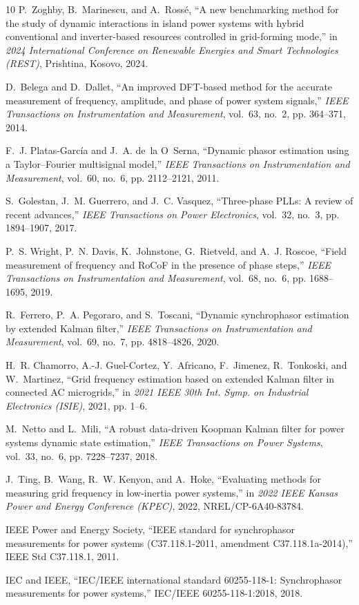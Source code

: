 \documentclass[conference,letterpaper]{IEEEtran}
\begin{document}
\begin{thebibliography}{10}
P.~Zoghby, B.~Marinescu, and A.~Ross{\'e}, ``A new benchmarking method for the
  study of dynamic interactions in island power systems with hybrid
  conventional and inverter-based resources controlled in grid-forming mode,''
  in \emph{2024 International Conference on Renewable Energies and Smart
  Technologies (REST)}, Prishtina, Kosovo, 2024.

D.~Belega and D.~Dallet, ``An improved {DFT}-based method for the accurate
  measurement of frequency, amplitude, and phase of power system signals,''
  \emph{IEEE Transactions on Instrumentation and Measurement}, vol.~63, no.~2,
  pp. 364--371, 2014.

F.~J. Platas-Garc{\'i}a and J.~A. de~la O~Serna, ``Dynamic phasor estimation
  using a {Taylor--Fourier} multisignal model,'' \emph{IEEE Transactions on
  Instrumentation and Measurement}, vol.~60, no.~6, pp. 2112--2121, 2011.

S.~Golestan, J.~M. Guerrero, and J.~C. Vasquez, ``Three-phase {PLL}s: A review
  of recent advances,'' \emph{IEEE Transactions on Power Electronics}, vol.~32,
  no.~3, pp. 1894--1907, 2017.

P.~S. Wright, P.~N. Davis, K.~Johnstone, G.~Rietveld, and A.~J. Roscoe, ``Field
  measurement of frequency and {RoCoF} in the presence of phase steps,''
  \emph{IEEE Transactions on Instrumentation and Measurement}, vol.~68, no.~6,
  pp. 1688--1695, 2019.

R.~Ferrero, P.~A. Pegoraro, and S.~Toscani, ``Dynamic synchrophasor estimation
  by extended {Kalman} filter,'' \emph{IEEE Transactions on Instrumentation and
  Measurement}, vol.~69, no.~7, pp. 4818--4826, 2020.

H.~R. Chamorro, A.-J. Guel-Cortez, Y.~Africano, F.~Jimenez, R.~Tonkoski, and
  W.~Martinez, ``Grid frequency estimation based on extended {Kalman} filter in
  connected {AC} microgrids,'' in \emph{2021 IEEE 30th Int. Symp. on Industrial
  Electronics (ISIE)}, 2021, pp. 1--6.

M.~Netto and L.~Mili, ``A robust data-driven {Koopman Kalman} filter for power
  systems dynamic state estimation,'' \emph{IEEE Transactions on Power
  Systems}, vol.~33, no.~6, pp. 7228--7237, 2018.

J.~Ting, B.~Wang, R.~W. Kenyon, and A.~Hoke, ``Evaluating methods for measuring
  grid frequency in low-inertia power systems,'' in \emph{2022 IEEE Kansas
  Power and Energy Conference (KPEC)}, 2022, {NREL}/CP-6A40-83784.

{IEEE Power and Energy Society}, ``{IEEE} standard for synchrophasor
  measurements for power systems ({C37.118.1-2011}, amendment
  {C37.118.1a-2014}),'' IEEE Std C37.118.1, 2011.

{IEC and IEEE}, ``{IEC/IEEE} international standard 60255-118-1: Synchrophasor
  measurements for power systems,'' IEC/IEEE 60255-118-1:2018, 2018.

\end{thebibliography}
\end{document}
